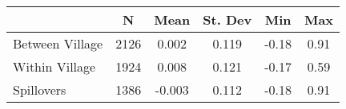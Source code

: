 \begin{tabular}{l*{5}{c}}\hline&\multicolumn{1}{c}{N}&\multicolumn{1}{c}{Mean}&\multicolumn{1}{c}{St. Dev}&\multicolumn{1}{c}{Min}&\multicolumn{1}{c}{Max}\\ \hline 
Between Village & 2126 & 0.002 & 0.119 & -0.18 & 0.91 \\
Within Village & 1924 & 0.008 & 0.121 & -0.17 & 0.59 \\
Spillovers & 1386 & -0.003 & 0.112 & -0.18 & 0.91 \\
\hline \end{tabular}
